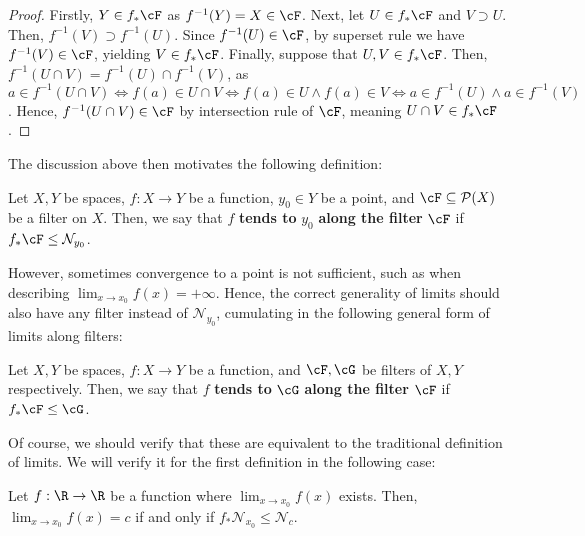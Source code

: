 \begin{proof}
  Firstly, \(Y \in f_*\cF\) as \(f^{-1}(Y) = X \in \cF\). Next, let \(U \in f_*\cF\) and \(V \supset U\). Then, \(f^{-1}(V) \supset f^{-1}(U)\). Since \(f^{-1}(U) \in \cF\), by superset rule we have \(f^{-1}(V) \in \cF\), yielding \(V \in f_*\cF\). Finally, suppose that \(U, V \in f_*\cF\). Then, \(f^{-1}(U \cap V) = f^{-1}(U) \cap f^{-1}(V)\), as \(a \in f^{-1}(U \cap V) \iff f(a) \in U \cap V \iff f(a) \in U \land f(a) \in V \iff a \in f^{-1}(U) \land a \in f^{-1}(V)\). Hence, \(f^{-1}(U \cap V) \in \cF\) by intersection rule of \(\cF\), meaning \(U \cap V \in f_*\cF\).
\end{proof}

The discussion above then motivates the following definition:

\begin{definition}
  Let \(X, Y\) be spaces, \(f : X \to Y\) be a function, \(y_0 \in Y\) be a point, and \(\cF \subseteq \mathcal{P}(X)\) be a filter on \(X\). Then, we say that \(f\) \textbf{tends to} \(y_0\) \textbf{along the filter} \(\cF\) if \(f_*\cF \leq \mathcal{N}_{y_0}\).
\end{definition}

However, sometimes convergence to a point is not sufficient, such as when describing \(\lim_{x \to x_0} f(x) = +\infty\). Hence, the correct generality of limits should also have any filter instead of \(\mathcal{N}_{y_0}\), cumulating in the following general form of limits along filters:

\begin{definition}
  Let \(X, Y\) be spaces, \(f : X \to Y\) be a function, and \(\cF, \cG\) be filters of \(X, Y\) respectively. Then, we say that \(f\) \textbf{tends to} \(\cG\) \textbf{along the filter} \(\cF\) if \(f_*\cF \leq \cG\).
\end{definition}

Of course, we should verify that these are equivalent to the traditional definition of limits. We will verify it for the first definition in the following case:

\begin{ttheorem}
  Let \(f : \R \to \R\) be a function where \(\lim_{x \to x_0} f(x)\) exists. Then, \(\lim_{x \to x_0} f(x) = c\) if and only if \(f_*\mathcal{N}_{x_0} \leq \mathcal{N}_c\).
\end{ttheorem}


